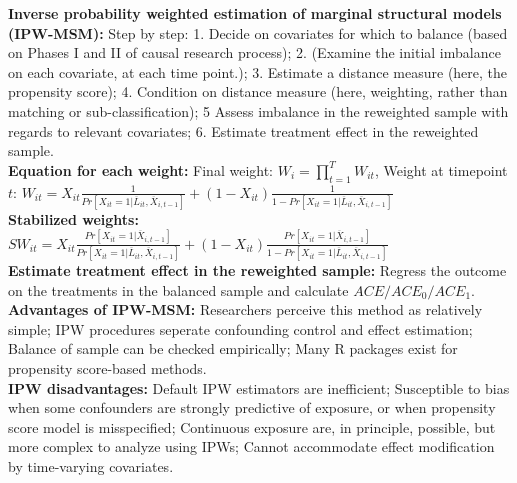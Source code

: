 \documentclass[a4paper,7pt,landscape]{extarticle}
\begin{document}
\begin{multicols}{3}
\begin{boxA}
\textbf{Inverse probability weighted estimation of marginal structural models (IPW-MSM):} Step by step: 1. Decide on covariates for which to balance (based on Phases I and II of causal research process); 2. (Examine the initial imbalance on each covariate, at each time point.); 3. Estimate a distance measure (here, the propensity score); 4. Condition on distance measure (here, weighting, rather than matching or sub-classification); 5 Assess imbalance in the reweighted sample with regards to relevant covariates; 6. Estimate treatment effect in the reweighted sample.\\
\textbf{Equation for each weight:} Final weight: $W_i = \prod_{t=1}^T W_{it}$, Weight at timepoint $t$: $W_{it} = X_{it} \frac{1}{Pr[X_{it} = 1 | \overline{L}_{it}, \overline{X}_{i,t-1}]}+(1-X_{it}) \frac{1}{1 - Pr[X_{it} = 1 | \overline{L}_{it}, \overline{X}_{i,t-1}]}$\\
\textbf{Stabilized weights:} $SW_{it} = X_{it} \frac{Pr[X_{it} = 1 | \overline{X}_{i,t-1}]}{Pr[X_{it} = 1 | \overline{L}_{it}, \overline{X}_{i,t-1}]}+(1-X_{it}) \frac{Pr[X_{it} = 1 | \overline{X}_{i,t-1}]}{1 - Pr[X_{it} = 1 | \overline{L}_{it}, \overline{X}_{i,t-1}]}$\\
\textbf{Estimate treatment effect in the reweighted sample:} Regress the outcome on the treatments in the balanced sample and calculate $ACE/ACE_0/ACE_1$.\\
\textbf{Advantages of IPW-MSM:} Researchers perceive this method as relatively simple; IPW procedures seperate confounding control and effect estimation; Balance of sample can be checked empirically; Many R packages exist for propensity score-based methods.\\
\textbf{IPW disadvantages:} Default IPW estimators are inefficient; Susceptible to bias when some confounders are strongly predictive of exposure, or when propensity score model is misspecified; Continuous exposure are, in principle, possible, but more complex to analyze using IPWs; Cannot accommodate effect modification by time-varying covariates.

\end{boxA}


\end{multicols}
\end{document}
